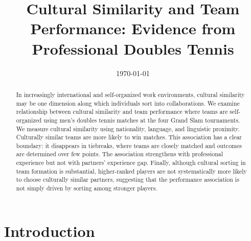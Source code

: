 \documentclass[10pt]{article}
\title{Cultural Similarity and Team Performance: Evidence from Professional Doubles Tennis}
\author{}
\date{\today}
\begin{document}
\maketitle
\thispagestyle{empty}

\begin{abstract}


In increasingly international and self-organized work environments, cultural similarity may be one dimension along which individuals sort into collaborations. %
We examine relationship between cultural similarity and team performance where teams are self-organized using men’s doubles tennis matches at the four Grand Slam tournaments. We measure cultural similarity using nationality,  language, and linguistic proximity. Culturally similar teams are more likely to win matches. This association has a clear boundary: it disappears in tiebreaks, where teams are closely matched and outcomes are determined over few points. The association strengthens with professional experience but not with partners' experience gap. Finally, although cultural sorting in team formation is substantial, higher-ranked players are not systematically more likely to choose culturally similar partners, suggesting that the performance association is not simply driven by sorting among stronger players.
\end{abstract}
\newpage
\setcounter{page}{1}
\section{Introduction}
\end{document}

